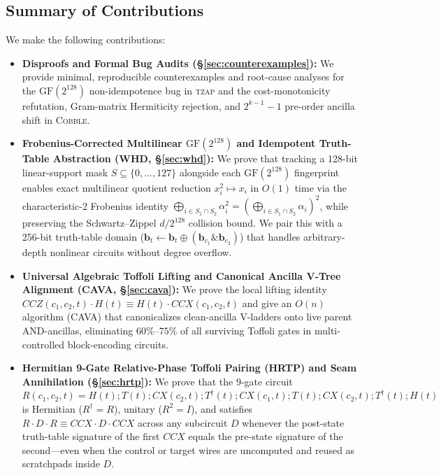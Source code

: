 \documentclass[11pt,a4paper]{article}
\theoremstyle{definition}
\begin{document}
\subsection{Summary of Contributions}

We make the following contributions:
\begin{itemize}
  \item \textbf{Disproofs and Formal Bug Audits (\S\ref{sec:counterexamples}):} We provide minimal, reproducible counterexamples and root-cause analyses for the $\mathrm{GF}(2^{128})$ non-idempotence bug in \textsc{tzap} and the cost-monotonicity refutation, Gram-matrix Hermiticity rejection, and $2^{k-1}-1$ pre-order ancilla shift in \textsc{Cobble}.
  \item \textbf{Frobenius-Corrected Multilinear $\mathrm{GF}(2^{128})$ and Idempotent Truth-Table Abstraction (\textsc{WHD}, \S\ref{sec:whd}):} We prove that tracking a 128-bit linear-support mask $S \subseteq \{0,\dots,127\}$ alongside each $\mathrm{GF}(2^{128})$ fingerprint enables exact multilinear quotient reduction $x_i^2 \mapsto x_i$ in $O(1)$ time via the characteristic-2 Frobenius identity $\bigoplus_{i \in S_1 \cap S_2} \alpha_i^2 = (\bigoplus_{i \in S_1 \cap S_2} \alpha_i)^2$, while preserving the Schwartz--Zippel $d/2^{128}$ collision bound. We pair this with a 256-bit truth-table domain ($\mathbf{b}_t \leftarrow \mathbf{b}_t \oplus (\mathbf{b}_{c_1} \mathbin{\&} \mathbf{b}_{c_2})$) that handles arbitrary-depth nonlinear circuits without degree overflow.
  \item \textbf{Universal Algebraic Toffoli Lifting and Canonical Ancilla V-Tree Alignment (\textsc{CAVA}, \S\ref{sec:cava}):} We prove the local lifting identity $\mathit{CCZ}(c_1, c_2, t)\cdot H(t) \equiv H(t)\cdot \mathit{CCX}(c_1, c_2, t)$ and give an $O(n)$ algorithm (\textsc{CAVA}) that canonicalizes clean-ancilla V-ladders onto live parent AND-ancillas, eliminating $60\%$--$75\%$ of all surviving Toffoli gates in multi-controlled block-encoding circuits.
  \item \textbf{Hermitian 9-Gate Relative-Phase Toffoli Pairing (\textsc{HRTP}) and Seam Annihilation (\S\ref{sec:hrtp}):} We prove that the 9-gate circuit $R(c_1, c_2, t) = H(t); T(t); \mathit{CX}(c_2,t); T^\dagger(t); \mathit{CX}(c_1,t); T(t); \mathit{CX}(c_2,t); T^\dagger(t); H(t)$ is Hermitian ($R^\dagger = R$), unitary ($R^2 = I$), and satisfies $R \cdot D \cdot R \equiv \mathit{CCX} \cdot D \cdot \mathit{CCX}$ across any subcircuit $D$ whenever the post-state truth-table signature of the first $\mathit{CCX}$ equals the pre-state signature of the second---even when the control or target wires are uncomputed and reused as scratchpads inside $D$.

\end{itemize}
\end{document}

